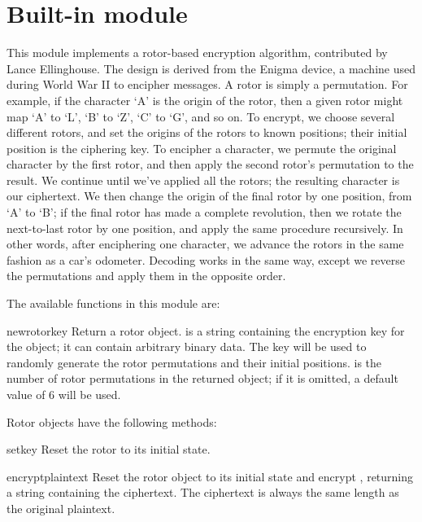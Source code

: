 \section{Built-in module }

This module implements a rotor-based encryption algorithm, contributed by
Lance Ellinghouse.  The design is derived from the Enigma device, a machine
used during World War II to encipher messages.  A rotor is simply a
permutation.  For example, if the character `A' is the origin of the rotor,
then a given rotor might map `A' to `L', `B' to `Z', `C' to `G', and so on.
To encrypt, we choose several different rotors, and set the origins of the
rotors to known positions; their initial position is the ciphering key.  To
encipher a character, we permute the original character by the first rotor,
and then apply the second rotor's permutation to the result. We continue
until we've applied all the rotors; the resulting character is our
ciphertext.  We then change the origin of the final rotor by one position,
from `A' to `B'; if the final rotor has made a complete revolution, then we
rotate the next-to-last rotor by one position, and apply the same procedure
recursively.  In other words, after enciphering one character, we advance
the rotors in the same fashion as a car's odometer. Decoding works in the
same way, except we reverse the permutations and apply them in the opposite
order.

The available functions in this module are:

\renewcommand{\indexsubitem}{(in module rotor)}
\begin{funcdesc}{newrotor}{key}
Return a rotor object.  is a string containing the encryption key
for the object; it can contain arbitrary binary data. The key will be used
to randomly generate the rotor permutations and their initial positions.
 is the number of rotor permutations in the returned object;
if it is omitted, a default value of 6 will be used.
\end{funcdesc}

Rotor objects have the following methods:

\renewcommand{\indexsubitem}{(rotor method)}
\begin{funcdesc}{setkey}{}
Reset the rotor to its initial state.
\end{funcdesc}

\begin{funcdesc}{encrypt}{plaintext}
Reset the rotor object to its initial state and encrypt ,
returning a string containing the ciphertext.  The ciphertext is always the
same length as the original plaintext.
\end{funcdesc}

